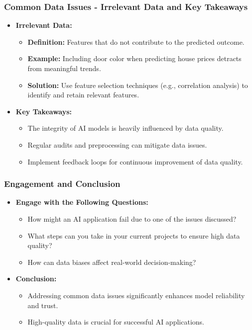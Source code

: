 \documentclass[aspectratio=169]{beamer}
\begin{document}
\begin{frame}[fragile]
    \frametitle{Common Data Issues - Irrelevant Data and Key Takeaways}
    \begin{itemize}
        \item \textbf{Irrelevant Data:}
            \begin{itemize}
                \item \textbf{Definition:} Features that do not contribute to the predicted outcome.
                \item \textbf{Example:} Including door color when predicting house prices detracts from meaningful trends.
                \item \textbf{Solution:} Use feature selection techniques (e.g., correlation analysis) to identify and retain relevant features.
            \end{itemize}
        \item \textbf{Key Takeaways:}
            \begin{itemize}
                \item The integrity of AI models is heavily influenced by data quality.
                \item Regular audits and preprocessing can mitigate data issues.
                \item Implement feedback loops for continuous improvement of data quality.
            \end{itemize}
    \end{itemize}
\end{frame}

\begin{frame}[fragile]
    \frametitle{Engagement and Conclusion}
    \begin{itemize}
        \item \textbf{Engage with the Following Questions:}
            \begin{itemize}
                \item How might an AI application fail due to one of the issues discussed?
                \item What steps can you take in your current projects to ensure high data quality?
                \item How can data biases affect real-world decision-making?
            \end{itemize}
        \item \textbf{Conclusion:} 
            \begin{itemize}
                \item Addressing common data issues significantly enhances model reliability and trust.
                \item High-quality data is crucial for successful AI applications.
            \end{itemize}
    \end{itemize}
\end{frame}
\end{document}
